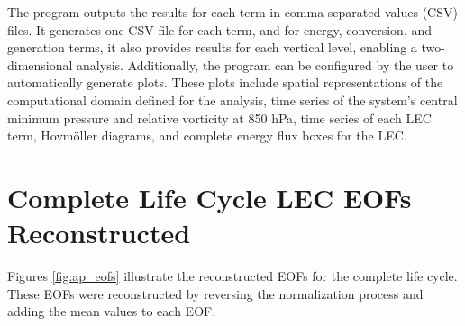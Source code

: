 The program outputs the results for each term in comma-separated values (CSV) files. It generates one CSV file for each term, and for energy, conversion, and generation terms, it also provides results for each vertical level, enabling a two-dimensional analysis. Additionally, the program can be configured by the user to automatically generate plots. These plots include spatial representations of the computational domain defined for the analysis, time series of the system's central minimum pressure and relative vorticity at 850 hPa, time series of each LEC term, Hovmöller diagrams, and complete energy flux boxes for the LEC.

\chapter{Complete Life Cycle LEC EOFs Reconstructed}\label{ap03}

Figures \ref{fig:ap_eofs} illustrate the reconstructed EOFs for the complete life cycle. These EOFs were reconstructed by reversing the normalization process and adding the mean values to each EOF.


